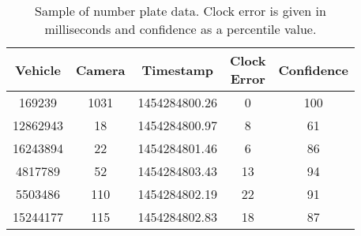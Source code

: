\begin{table}[t]
\centering
\tabcolsep=0.12cm
\begin{tabular}{c c c c c}
  \hline
  Vehicle & Camera & Timestamp & \thead{Clock \\Error} & Confidence \\
  \hline
  169239 & 1031 & 1454284800.26 &   0 & 100 \\
  12862943 & 18 & 1454284800.97 &   8 &  61 \\
  16243894 & 22 & 1454284801.46 &   6 &  86 \\
  4817789 & 52 & 1454284803.43 &  13 &  94 \\
  5503486 & 110 & 1454284802.19 &  22 &  91 \\
  15244177 & 115 & 1454284802.83 &  18 &  87 \\
   \hline
\end{tabular}
\caption{Sample of number plate data. Clock error is given in milliseconds and confidence as a percentile value.}
\label{t:np_data_example}
\vspace{-0.3cm}
\end{table}
